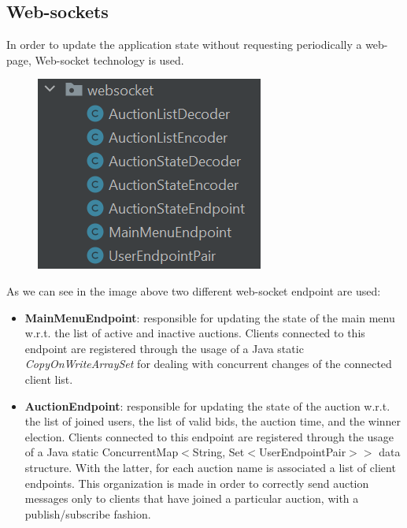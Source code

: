 \subsection{Web-sockets}
In order to update the application state without requesting periodically a web-page, Web-socket technology is used.

\begin{figure}[H]
	\centering
	\includegraphics[width=0.4\linewidth]{img/websockets}
	\caption{}
	\label{fig:websockets}
\end{figure}

As we can see in the image above two different web-socket endpoint are used:
\begin{itemize}
	\item \textbf{MainMenuEndpoint}: responsible for updating the state of the main menu w.r.t. the list of active and inactive auctions. Clients connected to this endpoint are registered through the usage of a Java static \textit{CopyOnWriteArraySet} for dealing with concurrent changes of the connected client list.
	\item \textbf{AuctionEndpoint}: responsible for updating the state of the auction w.r.t. the list of joined users, the list of valid bids, the auction time, and the winner election. Clients connected to this endpoint are registered through the usage of a Java static ConcurrentMap$<$String, Set$<$UserEndpointPair$>>$ data structure. With the latter, for each auction name is associated a list of client endpoints. This organization is made in order to correctly send auction messages only to clients that have joined a particular auction, with a publish/subscribe fashion.
\end{itemize}
